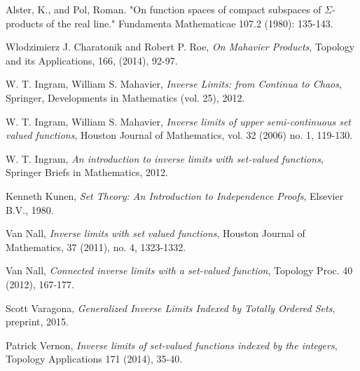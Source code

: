 \documentclass{amsart}
\theoremstyle{definition}
\newcommand{\<}{\langle}
\renewcommand{\>}{\rangle}
\begin{document}

\begin{thebibliography}{10}

\smallskip

 Alster, K., and Pol, Roman. "On function spaces of compact subspaces of $\Sigma$-products of the real line." Fundamenta Mathematicae 107.2 (1980): 135-143.

\smallskip

 Wlodzimierz J. Charatonik and Robert P. Roe, {\it On Mahavier Products}, Topology and its Applications,
166, (2014), 92-97.

\smallskip

 W. T. Ingram, William S. Mahavier, {\it Inverse Limits: from Continua to Chaos}, Springer, Developments in Mathematics (vol. 25), 2012.

\smallskip

 W. T. Ingram, William S. Mahavier, {\it Inverse limits of upper semi-continuous set valued functions}, Houston Journal of Mathematics, vol. 32 (2006) no. 1, 119-130.

\smallskip

 W. T. Ingram, {\it An introduction to inverse limits with set-valued functions}, Springer Briefs in Mathematics, 2012.

\smallskip

 Kenneth Kunen, {\it Set Theory: An Introduction to Independence Proofs}, Elsevier B.V., 1980.

\smallskip

 Van Nall, {\it Inverse limits with set valued functions}, Houston Journal of Mathematics, 37 (2011), no. 4, 1323-1332.

\smallskip

 Van Nall, {\it Connected inverse limits with a set-valued function}, Topology Proc. 40 (2012), 167-177.

\smallskip

 Scott Varagona, {\it Generalized Inverse Limits Indexed by Totally Ordered Sets}, preprint, 2015.

\smallskip

 Patrick Vernon, {\it Inverse limits of set-valued functions indexed by the integers}, Topology Applications 171 (2014), 35-40.
\end{thebibliography}
\end{document}
